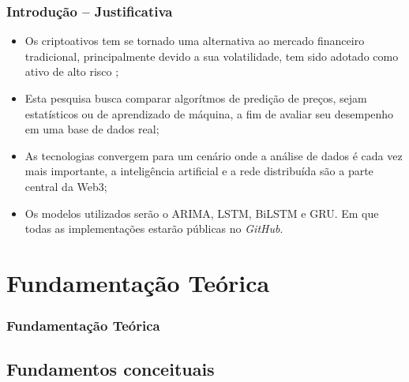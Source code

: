\documentclass[aspectratio=169]{beamer}
\begin{document}
\begin{frame}[fragile] \frametitle{Introdução -- Justificativa}
	\begin{itemize} \itemsep1em

    \item Os criptoativos tem se tornado uma alternativa ao mercado financeiro tradicional, principalmente devido a sua volatilidade, tem sido adotado como ativo de alto risco \cite{Sousa};
			
		\item Esta pesquisa busca comparar algorítmos de predição de preços, sejam estatísticos ou de aprendizado de máquina, a fim de avaliar seu desempenho em uma base de dados real;
			
		\item As tecnologias convergem para um cenário onde a análise de dados é cada vez mais importante, a inteligência artificial e a rede distribuída são a parte central da Web3;
		
    \item Os modelos utilizados serão o ARIMA, LSTM, BiLSTM e GRU. Em que todas as implementações estarão públicas no \textit{GitHub}.
		
    \end{itemize}
\end{frame}


\section{Fundamentação Teórica}

\begin{frame} \frametitle{Fundamentação Teórica}
\end{frame}





\subsection{Fundamentos conceituais}
\end{document}
